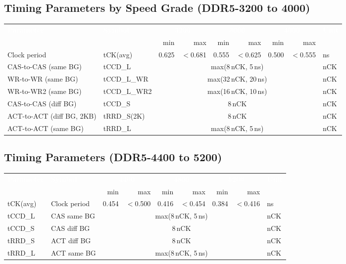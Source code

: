 \documentclass[10pt,a4paper,twoside]{article}
\newcommand{\thd}[1]{\cellcolor{navyblue}\textcolor{white}{\textbf{#1}}}
\newcommand{\thdm}[1]{\cellcolor{steelblue}\textcolor{white}{\small\textbf{#1}}}
\newcommand{\trow}{\rowcolor{lightgray}}
\newcommand{\talt}{\rowcolor{skyblue!30}}
\begin{document}
\subsection{Timing Parameters by Speed Grade (DDR5-3200 to 4000)}

\begin{center}
\begin{tabularx}{\linewidth}{@{} l l r r r r r r l @{}}
\toprule
\multirow{2}{*}{\thd{Parameter}} & \multirow{2}{*}{\thd{Symbol}} &
\multicolumn{2}{c}{\thdm{3200}} & \multicolumn{2}{c}{\thdm{3600}} &
\multicolumn{2}{c}{\thdm{4000}} & \multirow{2}{*}{\thd{Unit}} \\
& & min & max & min & max & min & max & \\
\midrule
\trow Clock period & tCK(avg) & 0.625 & $<$0.681 & 0.555 & $<$0.625 & 0.500 & $<$0.555 & ns \\
\talt CAS-to-CAS (same BG) & tCCD\_L & \multicolumn{6}{c}{max(8\,nCK, 5\,ns)} & nCK \\
\trow WR-to-WR (same BG) & tCCD\_L\_WR & \multicolumn{6}{c}{max(32\,nCK, 20\,ns)} & nCK \\
\talt WR-to-WR2 (same BG) & tCCD\_L\_WR2 & \multicolumn{6}{c}{max(16\,nCK, 10\,ns)} & nCK \\
\trow CAS-to-CAS (diff BG) & tCCD\_S & \multicolumn{6}{c}{8\,nCK} & nCK \\
\talt ACT-to-ACT (diff BG, 2KB) & tRRD\_S(2K) & \multicolumn{6}{c}{8\,nCK} & nCK \\
\trow ACT-to-ACT (same BG) & tRRD\_L & \multicolumn{6}{c}{max(8\,nCK, 5\,ns)} & nCK \\
\bottomrule
\end{tabularx}
\end{center}

\subsection{Timing Parameters (DDR5-4400 to 5200)}

\begin{center}
\begin{tabularx}{\linewidth}{@{} l l r r r r r r l @{}}
\toprule
\multirow{2}{*}{\thd{Parameter}} & \multirow{2}{*}{\thd{Symbol}} &
\multicolumn{2}{c}{\thdm{4400}} & \multicolumn{2}{c}{\thdm{4800}} &
\multicolumn{2}{c}{\thdm{5200}} & \multirow{2}{*}{\thd{Unit}} \\
& & min & max & min & max & min & max & \\
\midrule
\trow tCK(avg) & Clock period & 0.454 & $<$0.500 & 0.416 & $<$0.454 & 0.384 & $<$0.416 & ns \\
\talt tCCD\_L & CAS same BG & \multicolumn{6}{c}{max(8\,nCK, 5\,ns)} & nCK \\
\trow tCCD\_S & CAS diff BG & \multicolumn{6}{c}{8\,nCK} & nCK \\
\talt tRRD\_S & ACT diff BG & \multicolumn{6}{c}{8\,nCK} & nCK \\
\trow tRRD\_L & ACT same BG & \multicolumn{6}{c}{max(8\,nCK, 5\,ns)} & nCK \\
\bottomrule
\end{tabularx}
\end{center}
\end{document}

